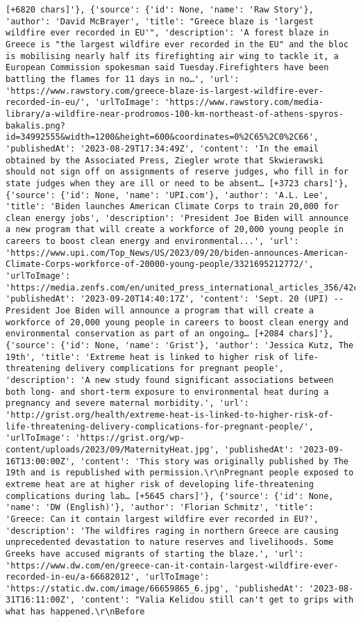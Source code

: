 \documentclass[
  letterpaper,
  DIV=11,
  numbers=noendperiod]{scrartcl}
\begin{document}
\begin{verbatim}
[+6820 chars]'}, {'source': {'id': None, 'name': 'Raw Story'}, 'author': 'David McBrayer', 'title': "Greece blaze is 'largest wildfire ever recorded in EU'", 'description': 'A forest blaze in Greece is "the largest wildfire ever recorded in the EU" and the bloc is mobilising nearly half its firefighting air wing to tackle it, a European Commission spokesman said Tuesday.Firefighters have been battling the flames for 11 days in no…', 'url': 'https://www.rawstory.com/greece-blaze-is-largest-wildfire-ever-recorded-in-eu/', 'urlToImage': 'https://www.rawstory.com/media-library/a-wildfire-near-prodromos-100-km-northeast-of-athens-spyros-bakalis.png?id=34992555&width=1200&height=600&coordinates=0%2C65%2C0%2C66', 'publishedAt': '2023-08-29T17:34:49Z', 'content': 'In the email obtained by the Associated Press, Ziegler wrote that Skwierawski should not sign off on assignments of reserve judges, who fill in for state judges when they are ill or need to be absent… [+3723 chars]'}, {'source': {'id': None, 'name': 'UPI.com'}, 'author': 'A.L. Lee', 'title': 'Biden launches American Climate Corps to train 20,000 for clean energy jobs', 'description': 'President Joe Biden will announce a new program that will create a workforce of 20,000 young people in careers to boost clean energy and environmental...', 'url': 'https://www.upi.com/Top_News/US/2023/09/20/biden-announces-American-Climate-Corps-workforce-of-20000-young-people/3321695212772/', 'urlToImage': 'https://media.zenfs.com/en/united_press_international_articles_356/42ce685d318816fcc51c5d2be3ba1d8f', 'publishedAt': '2023-09-20T14:40:17Z', 'content': 'Sept. 20 (UPI) -- President Joe Biden will announce a program that will create a workforce of 20,000 young people in careers to boost clean energy and environmental conservation as part of an ongoing… [+2084 chars]'}, {'source': {'id': None, 'name': 'Grist'}, 'author': 'Jessica Kutz, The 19th', 'title': 'Extreme heat is linked to higher risk of life-threatening delivery complications for pregnant people', 'description': 'A new study found significant associations between both long- and short-term exposure to environmental heat during a pregnancy and severe maternal morbidity.', 'url': 'http://grist.org/health/extreme-heat-is-linked-to-higher-risk-of-life-threatening-delivery-complications-for-pregnant-people/', 'urlToImage': 'https://grist.org/wp-content/uploads/2023/09/MaternityHeat.jpg', 'publishedAt': '2023-09-16T13:00:00Z', 'content': 'This story was originally published by The 19th and is republished with permission.\r\nPregnant people exposed to extreme heat are at higher risk of developing life-threatening complications during lab… [+5645 chars]'}, {'source': {'id': None, 'name': 'DW (English)'}, 'author': 'Florian Schmitz', 'title': 'Greece: Can it contain largest wildfire ever recorded in EU?', 'description': 'The wildfires raging in northern Greece are causing unprecedented devastation to nature reserves and livelihoods. Some Greeks have accused migrants of starting the blaze.', 'url': 'https://www.dw.com/en/greece-can-it-contain-largest-wildfire-ever-recorded-in-eu/a-66682012', 'urlToImage': 'https://static.dw.com/image/66659865_6.jpg', 'publishedAt': '2023-08-31T16:11:00Z', 'content': "Valia Kelidou still can't get to grips with what has happened.\r\nBefore 
\end{verbatim}
\end{document}
